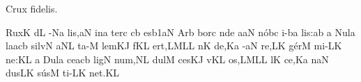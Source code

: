 \beginhymn Crux fidelis.

\vskip-1mm

\Internote
\nosolesmescustos
\initiumgregorianum
{}%
\sgn Rux\punctum K\egn
\spatium
{}d\punctum L\egn
{}-\pes Na\egn
\sgn li{s,}\clivis aN\egn
\spatium
\sgn {}in\punctum a\egn
\sgn ter\ngl{}\punctum c\egn
\spatium
{}\clivis cb\egn
\sgn {}es\episem b1\clivis aN\egn
\spatium
\divisiominima
\spatium
\sgn {}Ar\punctum b\egn
\sgn bor\punctum c\egn
\spatium
{}n\pes de\egn
\sgn {}a{}\clivis aN\egn
\spatium
\sgn n{\'o}b\punctum c\egn
\sgn {}i-\clivis ba\egn
\sgn li{s:}\punctum a\augmentum b\egn
\spatium
\divisiomaior
\spatium
\custos a
\lineaproxima
\sgn N{u}l\punctum a\egn
\sgn la{}\torculus acb\egn
\spatium
\sgn s{i}{lv}\punctum N\egn
\sgn {}a{}\clivis NL\egn
\spatium
\sgn t{a}-\punctum M\egn
\sgn lem\clivis KJ\egn
\spatium
{}f\pes KL\egn
\sgn {}e{rt,}\torculus LML\augmentum L\egn
\spatium
\divisiominima
\spatium
{}n\punctum K\egn
\sgn de,\pes Ka\egn
\spatium
{}-\clivis aN\egn
\sgn re,\clivis LK\egn
\spatium
\sgn g{\'e}r\punctum M\egn
\sgn mi-\clivis LK\egn
\sgn ne:\punctum K\augmentum L\egn
\spatium
\divisiomaior
\spatium
\custos a
\lineaproxima
\asteriscus
\spatium
\sgn D{u}l\punctum a\egn
\sgn ce{}\torculus acb\egn
\spatium
\sgn l{i}g\punctum N\egn
\sgn nu{m,}\clivis NL\egn
\spatium
\sgn d{u}l\punctum M\egn
\sgn ces\clivis KJ\egn
\spatium
{}v\pes KL\egn
\sgn {}o{s,}\torculus LML\augmentum L\egn
\spatium
\divisiominima
\spatium
{}l\punctum K\egn
\sgn ce,\pes Ka\egn
\spatium
{}n\clivis aN\egn
\sgn dus\clivis LK\egn
\spatium
\sgn s{\'u}s\punctum M\egn
\sgn ti-\clivis LK\egn
\sgn ne{t.}\punctum K\augmentum L\egn
\spatium
\Finisgregoriana

\bigskip


